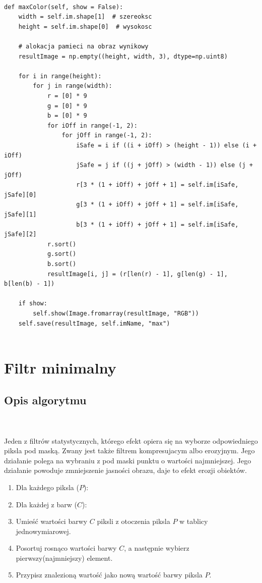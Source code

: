 \documentclass[final,a4paper,openany,12pt]{mwbk}
\begin{document}
\newpage

\begin{lstlisting}[caption=Filtr maksymalny (obraz barwny)]
	
def maxColor(self, show = False):
	width = self.im.shape[1]  # szereoksc
	height = self.im.shape[0]  # wysokosc
	
	# alokacja pamieci na obraz wynikowy
	resultImage = np.empty((height, width, 3), dtype=np.uint8)
	
	for i in range(height):
		for j in range(width):
			r = [0] * 9
			g = [0] * 9
			b = [0] * 9
			for iOff in range(-1, 2):
				for jOff in range(-1, 2):
					iSafe = i if ((i + iOff) > (height - 1)) else (i + iOff)
					jSafe = j if ((j + jOff) > (width - 1)) else (j + jOff)
					r[3 * (1 + iOff) + jOff + 1] = self.im[iSafe, jSafe][0]
					g[3 * (1 + iOff) + jOff + 1] = self.im[iSafe, jSafe][1]
					b[3 * (1 + iOff) + jOff + 1] = self.im[iSafe, jSafe][2]
			r.sort()
			g.sort()
			b.sort()
			resultImage[i, j] = (r[len(r) - 1], g[len(g) - 1], b[len(b) - 1])
	
	if show:
		self.show(Image.fromarray(resultImage, "RGB"))
	self.save(resultImage, self.imName, "max")
	
\end{lstlisting}



\newpage
\section{Filtr minimalny}
\subsection*{Opis algorytmu}
\hfill
\\\\
\indent  Jeden z filtrów statystycznych, którego efekt opiera się na wyborze odpowiedniego piksla pod maską. Zwany jest także filtrem kompresujacym albo erozyjnym. Jego działanie polega na wybraniu z pod maski punktu o wartości najmniejszej. Jego działanie powoduje zmniejszenie jasności obrazu,  daje to efekt erozji obiektów. 

\begin{enumerate}
	\item Dla każdego piksla ($P$):
	\item Dla każdej z barw ($C$):
	\item Umieść wartości barwy $C$ piksli z otoczenia piksla $P$ w tablicy jednowymiarowej.
	\item Posortuj rosnąco wartości barwy $C$, a następnie wybierz pierwszy(najmniejszy) element.
	\item Przypisz znalezioną wartość jako nową wartość barwy piksla $P$.
\end{enumerate}
\end{document}
